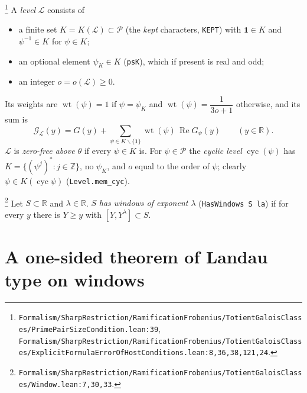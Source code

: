 \begin{definition}\label{def:E-level}
\footnote{\nolinkurl{Formalism/SharpRestriction/RamificationFrobenius/TotientGaloisClasses/PrimePairSizeCondition.lean:39}, \nolinkurl{Formalism/SharpRestriction/RamificationFrobenius/TotientGaloisClasses/ExplicitFormulaErrorOfHostConditions.lean:8,36,38,121,24}.}%
A \emph{level} $\mathcal L$ consists of
\begin{itemize}
\item a finite set $K=K(\mathcal L)\subset\mathcal P$ (the \emph{kept} characters, \texttt{KEPT})
with $\mathbf 1\in K$ and $\psi^{-1}\in K$ for $\psi\in K$;
\item an optional element $\psi_K\in K$ (\texttt{psK}), which if present is real and odd;
\item an integer $o=o(\mathcal L)\ge0$.
\end{itemize}
Its weights are $\operatorname{wt}(\psi)=1$ if $\psi=\psi_K$ and
$\operatorname{wt}(\psi)=\dfrac1{3o+1}$ otherwise, and its sum is
\[
\mathcal G_{\mathcal L}(y)=G(y)+\sum_{\psi\in K\smallsetminus\{\mathbf 1\}}\operatorname{wt}(\psi)\,
\operatorname{Re}G_\psi(y)\qquad(y\in\mathbb R).
\]
$\mathcal L$ is \emph{zero-free above $\theta$} if every $\psi\in K$ is. For $\psi\in\mathcal P$ the
\emph{cyclic level} $\operatorname{cyc}(\psi)$ has
$K=\{(\psi^{j})^{*}:j\in\mathbb Z\}$, no $\psi_K$, and $o$ equal to the order of $\psi$; clearly
$\psi\in K(\operatorname{cyc}\psi)$ (\texttt{Level.mem\_cyc}).
\end{definition}

\begin{definition}[Windows]\label{def:E-windows}
\footnote{\nolinkurl{Formalism/SharpRestriction/RamificationFrobenius/TotientGaloisClasses/Window.lean:7,30,33}.}%
Let $S\subset\mathbb R$ and $\lambda\in\mathbb R$. $S$ \emph{has windows of exponent $\lambda$}
(\texttt{HasWindows S la}) if for every $y$ there is $Y\ge y$ with $[Y,Y^{\lambda}]\subset S$.
\end{definition}

\section{A one-sided theorem of Landau type on windows}\label{sec:E-landau}

